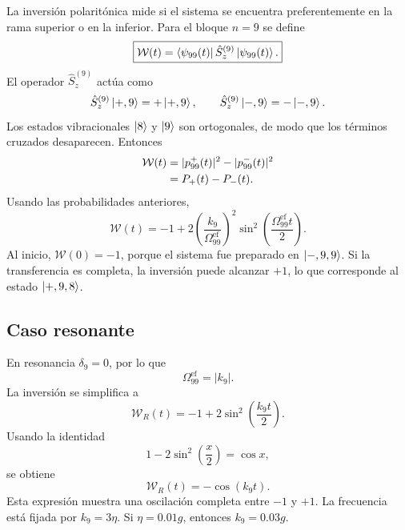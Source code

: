 \documentclass[11pt]{article}
\begin{document}
La inversi\'on polarit\'onica mide si el sistema se encuentra preferentemente
en la rama superior o en la inferior. Para el bloque $n=9$ se define
\begin{equation}
  \boxed{
  \mathcal W(t)
  =
  \bra{\psi_{99}(t)}
  \hat S_z^{(9)}
  \ket{\psi_{99}(t)}.
  }
\end{equation}
El operador $\hat S_z^{(9)}$ act\'ua como
\begin{equation}
  \hat S_z^{(9)}\ket{+,9}=+\ket{+,9},
  \qquad
  \hat S_z^{(9)}\ket{-,9}=-\ket{-,9}.
\end{equation}
Los estados vibracionales $\ket8$ y $\ket9$ son ortogonales, de modo que los
t\'erminos cruzados desaparecen. Entonces
\begin{align}
  \mathcal W(t)
  &=
  |p_{99}^{+}(t)|^2
  -
  |p_{99}^{-}(t)|^2
  \notag\\
  &=
  P_+(t)-P_-(t).
\end{align}
Usando las probabilidades anteriores,
\begin{equation}
  \boxed{
  \mathcal W(t)
  =
  -1+
  2
  \left(
  \frac{k_9}{\Omega_{99}^{\mathrm{ef}}}
  \right)^2
  \sin^2\!\left(
  \frac{\Omega_{99}^{\mathrm{ef}}t}{2}
  \right).
  }
\end{equation}
Al inicio, $\mathcal W(0)=-1$, porque el sistema fue preparado en
$\ket{-,9,9}$. Si la transferencia es completa, la inversi\'on puede alcanzar
$+1$, lo que corresponde al estado $\ket{+,9,8}$.

\subsection{Caso resonante}

En resonancia $\delta_9=0$, por lo que
\begin{equation}
  \Omega_{99}^{\mathrm{ef}}=|k_9|.
\end{equation}
La inversi\'on se simplifica a
\begin{equation}
  \mathcal W_R(t)
  =
  -1+2\sin^2\!\left(\frac{k_9t}{2}\right).
\end{equation}
Usando la identidad
\begin{equation}
  1-2\sin^2\left(\frac{x}{2}\right)=\cos x,
\end{equation}
se obtiene
\begin{equation}
  \boxed{
  \mathcal W_R(t)
  =
  -\cos(k_9t).
  }
\end{equation}
Esta expresi\'on muestra una oscilaci\'on completa entre $-1$ y $+1$. La
frecuencia est\'a fijada por $k_9=3\eta$. Si $\eta=0.01g$, entonces
$k_9=0.03g$.
\end{document}
